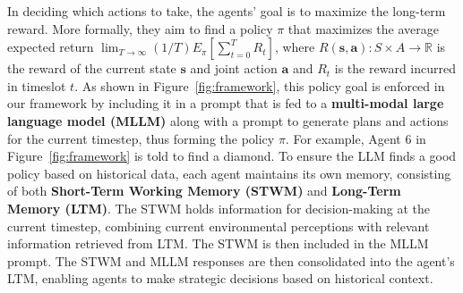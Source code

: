  
In deciding which actions to take, the agents' goal is to maximize the long-term reward. More formally, they aim to find a policy $\pi$ that maximizes the average expected return $\lim_{T \to \infty} (1/T) E_{\pi} [{\sum_{t=0}^T R_{t}}]$, where $R(\boldsymbol{s}, \boldsymbol{a}): S \times A \to \mathbb{R}$ is the reward of the current state $\boldsymbol{s}$ and joint action $\boldsymbol{a}$ and $R_t$ is the reward incurred in timeslot $t$. As shown in Figure~\ref{fig:framework}, this policy goal is enforced in our framework by including it in a prompt that is fed to a \textbf{multi-modal large language model (MLLM)} along with a prompt to generate plans and actions for the current timestep, thus forming the policy $\pi$. For example, Agent 6 in Figure~\ref{fig:framework} is told to find a diamond.
To ensure the LLM finds a good policy based on historical data, each agent maintains its own memory, consisting of  both \textbf{Short-Term Working Memory (\textbf{STWM})} and \textbf{Long-Term Memory (LTM)}. The STWM holds information for decision-making at the current timestep, combining current environmental perceptions with relevant information retrieved from LTM. The STWM is then included in the MLLM prompt. %
The STWM and MLLM responses are then consolidated into the agent’s LTM, enabling agents to make strategic decisions based on historical context.



